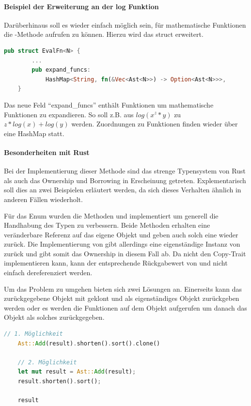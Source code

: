 \documentclass[11pt,a4paper, ngerman]{article}
\begin{document}
\paragraph{Beispiel der Erweiterung an der log Funktion} Darüberhinaus soll es wieder einfach möglich sein, für mathematische Funktionen die -Methode aufrufen zu können. Hierzu wird das struct  erweitert.

\begin{lstlisting}[language=rust, caption={EvalFn nach expand}]
    pub struct EvalFn<N> {
        ...
        pub expand_funcs: 
            HashMap<String, fn(&Vec<Ast<N>>) -> Option<Ast<N>>>,
    }
\end{lstlisting}

Das neue Feld ``expand\_funcs'' enthält Funktionen um mathematische Funktionen zu expandieren. So soll z.B. aus $log(x^z*y)$ zu $z*log(x)+log(y)$ werden. Zuordnungen zu Funktionen finden wieder über eine HashMap statt.

\paragraph{Besonderheiten mit Rust} Bei der Implementierung dieser Methode sind das strenge Typensystem von Rust als auch das Ownership und Borrowing in Erscheinung getreten. Explementarisch soll dies an zwei Beispielen erläutert werden, da sich dieses Verhalten ähnlich in anderen Fällen wiederholt.

Für das Enum  wurden die Methoden  und  implementiert um generell die Handhabung des Typen zu verbessern. Beide Methoden erhalten eine veränderbare Referenz auf das eigene Objekt und geben auch solch eine wieder zurück. Die Implementierung von  gibt allerdings eine eigenständige Instanz von  zurück und gibt somit das Ownership in diesem Fall ab. Da  nicht den Copy-Trait implementieren kann, kann der entsprechende Rückgabewert von  und  nicht einfach dereferenziert werden.

Um das Problem zu umgehen bieten sich zwei Lösungen an. Einerseits kann das zurückgegebene Objekt mit  geklont und als eigenständiges Objekt zurückgeben werden oder es werden die Funktionen auf dem Objekt aufgerufen um danach das Objekt als solches zurückgegeben.

\begin{lstlisting}[language=rust, caption={Mögliche Lösungen für Rückgabewerte}]
    // 1. Möglichkeit
    Ast::Add(result).shorten().sort().clone()

    // 2. Möglichkeit
    let mut result = Ast::Add(result);
    result.shorten().sort();

    result
\end{lstlisting}
\end{document}

